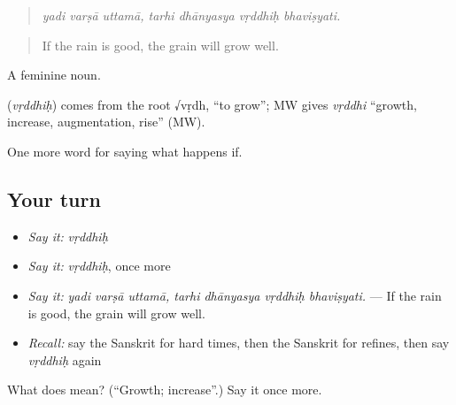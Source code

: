 \begin{quote}
\emph{yadi varṣā uttamā, tarhi dhānyasya vṛddhiḥ bhaviṣyati.}
\end{quote}

\begin{quote}
If the rain is good, the grain will grow well.
\end{quote}

A feminine noun.

\begin{cousinweb}
\textbf{} (\emph{vṛddhiḥ}) comes from the root √vṛdh, \textquotedblleft{}to grow\textquotedblright{}; MW gives \emph{vṛddhi} \textquotedblleft{}growth, increase, augmentation, rise\textquotedblright{} (MW).
\end{cousinweb}

\begin{grammarlens}[title={What you've built}]
One more word for saying what happens if.
\end{grammarlens}

\subsection*{Your turn}
\begin{itemize}
\raggedright
  \item \emph{Say it:} \emph{vṛddhiḥ}
  \item \emph{Say it:} \emph{vṛddhiḥ}, once more
  \item \emph{Say it:} \emph{yadi varṣā uttamā, tarhi dhānyasya vṛddhiḥ bhaviṣyati.} — If the rain is good, the grain will grow well.
  \item \emph{Recall:} say the Sanskrit for hard times, then the Sanskrit for refines, then say \emph{vṛddhiḥ} again
\end{itemize}

\begin{tcolorbox}[breakable,colback=teal!4,colframe=teal!35!black,title={Before you move on}]
What does  mean? (\textquotedblleft{}Growth; increase\textquotedblright{}.) Say it once more.
\end{tcolorbox}

